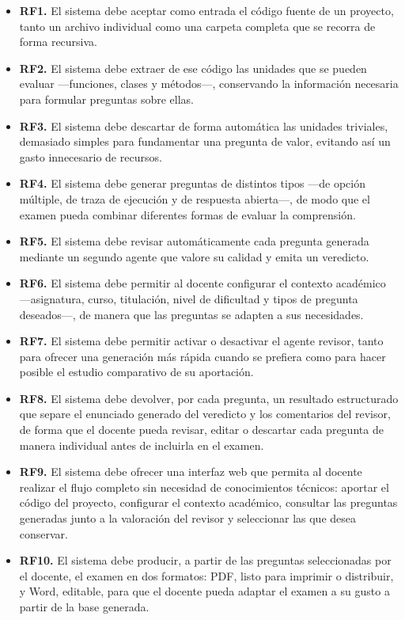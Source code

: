 \begin{itemize}
  \item \textbf{RF1.} El sistema debe aceptar como entrada el código
        fuente de un proyecto, tanto un archivo individual como una
        carpeta completa que se recorra de forma recursiva.
  \item \textbf{RF2.} El sistema debe extraer de ese código las unidades
        que se pueden evaluar ---funciones, clases y métodos---,
        conservando la información necesaria para formular preguntas
        sobre ellas.
  \item \textbf{RF3.} El sistema debe descartar de forma automática las
        unidades triviales, demasiado simples para fundamentar una
        pregunta de valor, evitando así un gasto innecesario de recursos.
  \item \textbf{RF4.} El sistema debe generar preguntas de distintos
        tipos ---de opción múltiple, de traza de ejecución y de respuesta
        abierta---, de modo que el examen pueda combinar diferentes
        formas de evaluar la comprensión.
  \item \textbf{RF5.} El sistema debe revisar automáticamente cada
        pregunta generada mediante un segundo agente que valore su
        calidad y emita un veredicto.
  \item \textbf{RF6.} El sistema debe permitir al docente configurar el
        contexto académico ---asignatura, curso, titulación, nivel de
        dificultad y tipos de pregunta deseados---, de manera que las
        preguntas se adapten a sus necesidades.
  \item \textbf{RF7.} El sistema debe permitir activar o desactivar el
        agente revisor, tanto para ofrecer una generación más rápida
        cuando se prefiera como para hacer posible el estudio comparativo
        de su aportación.
  \item \textbf{RF8.} El sistema debe devolver, por cada pregunta, un
        resultado estructurado que separe el enunciado generado del
        veredicto y los comentarios del revisor, de forma que el docente
        pueda revisar, editar o descartar cada pregunta de manera
        individual antes de incluirla en el examen.
  \item \textbf{RF9.} El sistema debe ofrecer una interfaz web que
        permita al docente realizar el flujo completo sin necesidad de
        conocimientos técnicos: aportar el código del proyecto,
        configurar el contexto académico, consultar las preguntas
        generadas junto a la valoración del revisor y seleccionar las que
        desea conservar.
  \item \textbf{RF10.} El sistema debe producir, a partir de las
        preguntas seleccionadas por el docente, el examen en dos formatos:
        PDF, listo para imprimir o distribuir, y Word, editable, para que
        el docente pueda adaptar el examen a su gusto a partir de la base
        generada.
\end{itemize}

